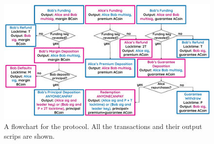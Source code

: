 \documentclass{article}
\begin{document}
\begin{figure}
    \centering
    \includegraphics[width=\textwidth]{ABCDfateme.pdf}
    \caption{ A flowchart for the protocol. All the transactions and their output scrips are shown. }
    \label{fig:flowchart}
\end{figure}
 
\end{document}
